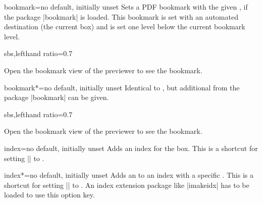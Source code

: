 \begin{docTcbKey}[][doc new=2017-02-10]{bookmark}{=}{no default, initially unset}
  Sets a PDF bookmark with the given , if the package |bookmark| \cite{oberdiek:bookmark}
  is loaded. This bookmark is set with an automated destination (the current box)
  and is set one level below the current bookmark level.
  \begin{dispExample*}{sbs,lefthand ratio=0.7}
\begin{tcolorbox}[colback=blue!10,colframe=blue!50!black,
  bookmark=Example for using a bookmark,
  title=Example for using a bookmark]
Open the bookmark view of the previewer
to see the bookmark.
\end{tcolorbox}
  \end{dispExample*}
\end{docTcbKey}


\begin{docTcbKey}[][doc new=2017-02-10]{bookmark*}{=}{no default, initially unset}
  Identical to , but additional 
  from the package |bookmark| \cite{oberdiek:bookmark} can be given.
  \begin{dispExample*}{sbs,lefthand ratio=0.7}
\begin{tcolorbox}[colback=red!10,colframe=red!50!black,
  bookmark*={color=red,italic,bold}%
            {Another bookmark example},
  title=Red and bold bookmark]
Open the bookmark view of the previewer
to see the bookmark.
\end{tcolorbox}
  \end{dispExample*}
\end{docTcbKey}



\begin{docTcbKey}[][doc new=2018-07-26]{index}{=}{no default, initially unset}
  Adds an index  for the box. This is a shortcut for
  setting |\index| to .
\end{docTcbKey}


\begin{docTcbKey}[][doc new=2018-07-26]{index*}{=}{no default, initially unset}
  Adds an  to an index with a specific .
  This is a shortcut for
  setting |\index| to .
  An index extension package like |imakeidx| has to be loaded to use
  this option key.
\end{docTcbKey}








